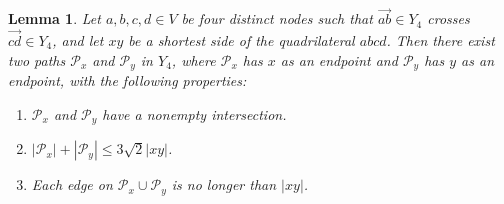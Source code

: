 \pdfoutput=1  \documentclass[11pt]{article}
\newtheorem{lemma}{Lemma}
\newcommand{\Pa}{{\mathcal P}}
\begin{document}
\begin{lemma}
Let $a, b, c, d \in V$ be four distinct nodes such that
$\overrightarrow{ab} \in Y_4$ crosses
$\overrightarrow{cd} \in Y_4$, and let
$xy$ be a shortest side of the quadrilateral $abcd$.
Then there exist two paths $\Pa_x$ and $\Pa_y$ in $Y_4$, where
$\Pa_x$ has $x$ as an endpoint and $\Pa_y$ has $y$ as an endpoint,
with the following properties:
\begin{enumerate}
\item[(a)] $\Pa_x$ and $\Pa_y$ have a nonempty intersection.
\item[(b)] $|\Pa_x| + |\Pa_y| \le 3 \sqrt{2} |xy|$.
\item[(c)] Each edge on $\Pa_x \cup \Pa_y$ is no longer than $|xy|$.
\end{enumerate}
\label{lem:pathcross}
\end{lemma}
\end{document}
